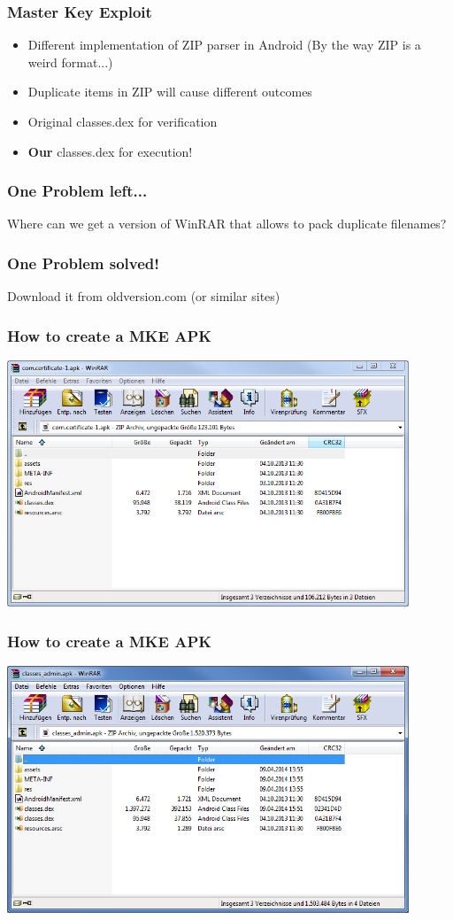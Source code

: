 \documentclass[12pt,a4paper]{beamer}
\begin{document}
\begin{frame}
\frametitle{Master Key Exploit}
\begin{itemize}
	\item Different implementation of ZIP parser in Android
	(By the way ZIP is a weird format...)
	\item Duplicate items in ZIP will cause different outcomes
	\item Original classes.dex for verification
	\item \textbf{Our} classes.dex for execution! 
\end{itemize}
\end{frame}

\begin{frame}
\frametitle{One Problem left...}
\large
\centering
Where can we get a version of WinRAR that allows to pack duplicate filenames?

\end{frame}

\begin{frame}
\frametitle{One Problem solved!}
\large
\centering

Download it from oldversion.com (or similar sites)

\end{frame}


\begin{frame}
\frametitle{How to create a MKE APK}
\centering
\includegraphics[width=0.9\textwidth]{images/before-mke.png}
\end{frame}

\begin{frame}
\frametitle{How to create a MKE APK}
\centering
\includegraphics[width=0.9\textwidth]{images/after-mke.png}
\end{frame}
\end{document}
